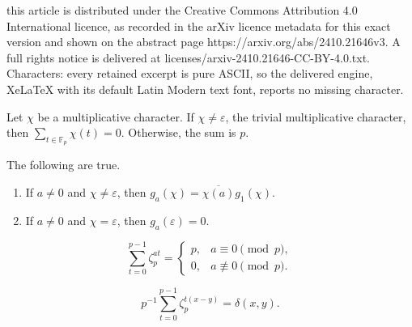 \documentclass[10pt,a4paper]{amsart}
\newcommand{\eps}{\varepsilon}
\begin{document}
this article is distributed under the Creative Commons Attribution 4.0 International licence, as recorded in the arXiv licence metadata for this exact version and shown on the abstract page https://arxiv.org/abs/2410.21646v3. A full rights notice is delivered at licenses/arxiv-2410.21646-CC-BY-4.0.txt. Characters: every retained excerpt is pure ASCII, so the delivered engine, XeLaTeX with its default Latin Modern text font, reports no missing character.
\begin{prop} \label{Proposition: proof about sum of elements evaluated by a character prop}
    Let $\chi$ be a multiplicative character. If $\chi\neq\eps$, the trivial multiplicative character, then $\sum_{t\in \mathbb{F}_{p}}\chi(t)=0$. Otherwise, the sum is $p$. 
\end{prop}

\begin{lemma} \label{Lemma: two properties of the Gauss sum}
The following are true. 
    \begin{enumerate}
        \item If $a\neq 0$ and $\chi\neq \eps$, then $g_{a}(\chi)=\overline{\chi(a)}g_{1}(\chi)$. 
        \item If $a\neq 0$ and $\chi = \eps$, then $g_{a}(\eps)=0$.
    \end{enumerate}
\end{lemma}

\begin{lemma} \label{Lemma: result about zeta from special property prop about Gauss sums about zeta from special property prop about Gauss sums}
    \begin{equation*}
        \sum_{t=0}^{p-1}\zeta_{p}^{at} = \left\{ \begin{array}{ll}
            p, & a\equiv 0\pmod{p}, \\
            0, & a\not\equiv 0\pmod{p}.
        \end{array}
        \right.
    \end{equation*}
\end{lemma}

\begin{cor}\label{corollary to Lemma 3.7}
    \begin{equation*}
     p^{-1}\sum_{t=0}^{p-1}\zeta_{p}^{t(x-y)}  = \delta(x,y).
\end{equation*}
\end{cor}
\end{document}
